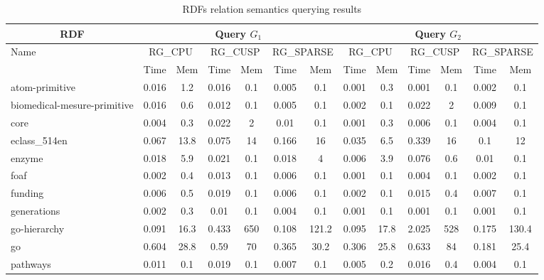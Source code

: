 {\setlength{\tabcolsep}{0.4em}
\begin{table*}[h]
\caption{RDFs relation semantics querying results}
\label{tbl:tableRDFRelationalPathIndex}
\begin{tabular}{| l | c  c | c  c | c  c | c  c | c  c | c  c |}
    \hline
    \multicolumn{1}{|c|}{RDF}	&	\multicolumn{6}{|c|}{Query $G_1$}	&	\multicolumn{6}{|c|}{Query $G_2$} \\
    \hline
    \multirow{2}{*}{Name}	&	\multicolumn{2}{|c|}{RG\_CPU}	&	\multicolumn{2}{|c|}{RG\_CUSP}	&	\multicolumn{2}{|c|}{RG\_SPARSE}	&	\multicolumn{2}{|c|}{RG\_CPU}	&	\multicolumn{2}{|c|}{RG\_CUSP}	&	\multicolumn{2}{|c|}{RG\_SPARSE} \\
    		& Time & Mem &  Time     & Mem & Time     & Mem & Time     & Mem & Time     & Mem &  Time     & Mem \\    
    \hline
    \hline
    atom-primitive              & 0.016 & 1.2  & 0.016 & 0.1 & 0.005 & 0.1   & 0.001 & 0.3  & 0.001 & 0.1 & 0.002 & 0.1   \\
biomedical-mesure-primitive & 0.016 & 0.6  & 0.012 & 0.1 & 0.005 & 0.1   & 0.002 & 0.1  & 0.022 & 2   & 0.009 & 0.1   \\
core                        & 0.004 & 0.3  & 0.022 & 2   & 0.01  & 0.1   & 0.001 & 0.3  & 0.006 & 0.1 & 0.004 & 0.1   \\
eclass\_514en                 & 0.067 & 13.8 & 0.075 & 14  & 0.166 & 16    & 0.035 & 6.5  & 0.339 & 16  & 0.1   & 12    \\
enzyme                      & 0.018 & 5.9  & 0.021 & 0.1 & 0.018 & 4     & 0.006 & 3.9  & 0.076 & 0.6 & 0.01  & 0.1   \\
foaf                        & 0.002 & 0.4  & 0.013 & 0.1 & 0.006 & 0.1   & 0.001 & 0.1  & 0.004 & 0.1 & 0.002 & 0.1   \\
funding                     & 0.006 & 0.5  & 0.019 & 0.1 & 0.006 & 0.1   & 0.002 & 0.1  & 0.015 & 0.4 & 0.007 & 0.1   \\
generations                 & 0.002 & 0.3  & 0.01  & 0.1 & 0.004 & 0.1   & 0.001 & 0.1  & 0.001 & 0.1 & 0.001 & 0.1   \\
go-hierarchy                & 0.091 & 16.3 & 0.433 & 650 & 0.108 & 121.2 & 0.095 & 17.8 & 2.025 & 528 & 0.175 & 130.4 \\
go                          & 0.604 & 28.8 & 0.59  & 70  & 0.365 & 30.2  & 0.306 & 25.8 & 0.633 & 84  & 0.181 & 25.4  \\
pathways                    & 0.011 & 0.1  & 0.019 & 0.1 & 0.007 & 0.1   & 0.005 & 0.2  & 0.016 & 0.4 & 0.004 & 0.1   \\

\end{tabular}
\end{table*}}
